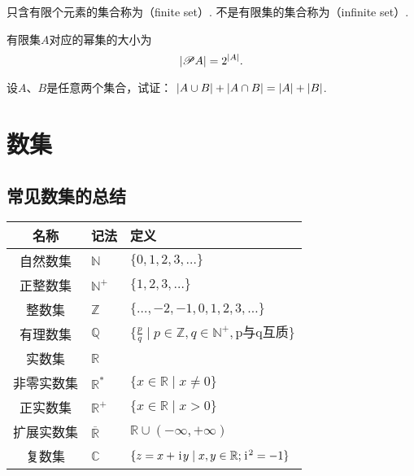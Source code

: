 \begin{definition}
只含有限个元素的集合称为（finite set）.
不是有限集的集合称为（infinite set）.
\end{definition}

\begin{property}
有限集\(A\)对应的幂集的大小为\[
	\abs{\mathscr{P} A} = 2^{\abs{A}}.
\]
\end{property}

\begin{example}
设\(A\)、\(B\)是任意两个集合，试证：
\(\abs{A \cup B} + \abs{A \cap B} = \abs{A} + \abs{B}\).
\end{example}

\section{数集}
\subsection{常见数集的总结}
\begin{center}
\begin{tabular}{c|l|l}
\hline
名称 & 记法 & 定义 \\ \hline
自然数集 & \(\mathbb{N}\) & \(\{ 0,1,2,3,\dotsc \}\) \\
正整数集 & \(\mathbb{N}^+\) & \(\{ 1,2,3,\dotsc \}\) \\
整数集 & \(\mathbb{Z}\) & \(\{ \dotsc,-2,-1,0,1,2,3,\dotsc \}\) \\
有理数集 & \(\mathbb{Q}\) & \(\{ \frac{p}{q} \mid p \in \mathbb{Z}, q \in \mathbb{N}^+, \text{p与q互质} \}\) \\
实数集 & \(\mathbb{R}\) \\
非零实数集 & \(\mathbb{R}^*\) & \(\{ x \in \mathbb{R} \mid x \neq 0 \}\) \\
正实数集 & \(\mathbb{R}^+\) & \(\{ x \in \mathbb{R} \mid x > 0 \}\) \\
扩展实数集 & \(\overline{\mathbb{R}}\) & \(\mathbb{R} \cup (-\infty,+\infty)\) \\
复数集 & \(\mathbb{C}\) & \(\{ z = x + \kern1pt\mathrm{i}\kern1pt y \mid x,y \in \mathbb{R}; \kern1pt\mathrm{i}\kern1pt^2 = -1 \}\) \\ \hline
\end{tabular}
\end{center}

